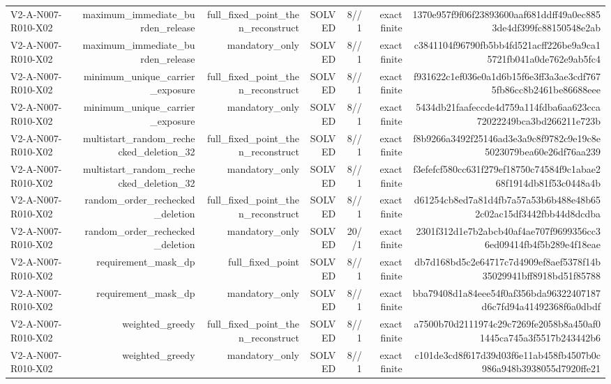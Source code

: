 {\begin{longtable}{lrrrrrr}
V2-A-N007-R010-X02 & maximum\_immediate\_burden\_release & full\_fixed\_point\_then\_reconstruct & SOLVED & 8//1 & exact finite & 1370e957f9f06f23893600aaf681ddff49a0ec8853de4df399fc88150548e2ab \\
V2-A-N007-R010-X02 & maximum\_immediate\_burden\_release & mandatory\_only & SOLVED & 8//1 & exact finite & c3841104f96790fb5bb4fd521acff226be9a9ca15721fb041a0de762e9ab5fc4 \\
V2-A-N007-R010-X02 & minimum\_unique\_carrier\_exposure & full\_fixed\_point\_then\_reconstruct & SOLVED & 8//1 & exact finite & f931622c1ef036e0a1d6b15f6e3ff3a3ae3cdf7675fb86cc8b2461be86688eee \\
V2-A-N007-R010-X02 & minimum\_unique\_carrier\_exposure & mandatory\_only & SOLVED & 8//1 & exact finite & 5434db21faafeccde4d759a114fdba6aa623cca72022249bca3bd266211e723b \\
V2-A-N007-R010-X02 & multistart\_random\_rechecked\_deletion\_32 & full\_fixed\_point\_then\_reconstruct & SOLVED & 8//1 & exact finite & f8b9266a3492f25146ad3e3a9c8f9782c9e19c8e5023079bea60e26df76aa239 \\
V2-A-N007-R010-X02 & multistart\_random\_rechecked\_deletion\_32 & mandatory\_only & SOLVED & 8//1 & exact finite & f3efefcf580cc631f279ef18750c74584f9c1abae268f1914db81f53c0448a4b \\
V2-A-N007-R010-X02 & random\_order\_rechecked\_deletion & full\_fixed\_point\_then\_reconstruct & SOLVED & 8//1 & exact finite & d61254cb8ed7a81d4fb7a57a53b6b488e48b652c02ac15df3442fbb44d8dcdba \\
V2-A-N007-R010-X02 & random\_order\_rechecked\_deletion & mandatory\_only & SOLVED & 20//1 & exact finite & 2301f312d1e7b2abcb40af4ae707f9699356cc36ed09414fb4f5b289e4f18eae \\
V2-A-N007-R010-X02 & requirement\_mask\_dp & full\_fixed\_point & SOLVED & 8//1 & exact finite & db7d168bd5c2e64717c7d4909ef8aef5378f14b35029941bff8918bd51f85788 \\
V2-A-N007-R010-X02 & requirement\_mask\_dp & mandatory\_only & SOLVED & 8//1 & exact finite & bba79408d1a84eee54f0af356bda96322407187d6c7fd94a41492368f6a0dbdf \\
V2-A-N007-R010-X02 & weighted\_greedy & full\_fixed\_point\_then\_reconstruct & SOLVED & 8//1 & exact finite & a7500b70d2111974c29c7269fe2058b8a450af01445ca745a3f5517b243442b6 \\
V2-A-N007-R010-X02 & weighted\_greedy & mandatory\_only & SOLVED & 8//1 & exact finite & c101de3cd8f617d39d03f6e11ab458fb4507b0c986a948b3938055d7920ffe21 \\

\end{longtable}}
